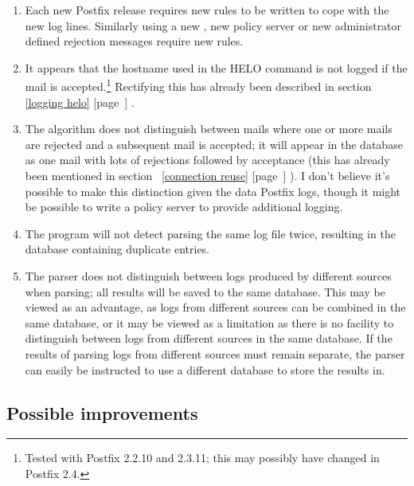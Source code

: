 \documentclass[a4paper,12pt,draft]{article}
\newcommand{\refwithpage}[1]{%
    \empty{}\ref{#1} [page~\pageref{#1}]%
}
\begin{document}
\begin{enumerate}

    \item Each new Postfix release requires new rules to be written to cope
        with the new log lines.  Similarly using a new \RBL{}, new policy
        server or new administrator defined rejection messages require new
        rules.

    \item It appears that the hostname used in the HELO command is not
        logged if the mail is accepted.\footnote{Tested with Postfix 2.2.10
        and 2.3.11; this may possibly have changed in Postfix 2.4.}
        Rectifying this has already been described in
        section~\refwithpage{logging helo}.

    \item The algorithm does not distinguish between mails where one or
        more mails are rejected and a subsequent mail is accepted; it will
        appear in the database as one mail with lots of rejections followed
        by acceptance (this has already been mentioned in
        section~\refwithpage{connection reuse}).  I don't believe it's
        possible to make this distinction given the data Postfix logs,
        though it might be possible to write a policy server to provide
        additional logging.

    \item The program will not detect parsing the same log file twice,
        resulting in the database containing duplicate entries.

    \item The parser does not distinguish between logs produced by
        different sources when parsing; all results will be saved to the
        same database.  This may be viewed as an advantage, as logs from
        different sources can be combined in the same database, or it may
        be viewed as a limitation as there is no facility to distinguish
        between logs from different sources in the same database.  If the
        results of parsing logs from different sources must remain
        separate, the parser can easily be instructed to use a different
        database to store the results in.

\end{enumerate}

\subsection{Possible improvements}
\end{document}
